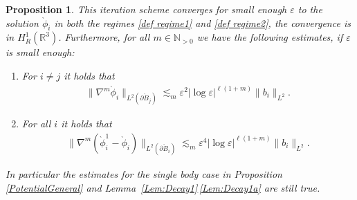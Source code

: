 \documentclass[10pt]{amsart}
\let\epsilon\varepsilon
\newtheorem{proposition}[theorem]{Proposition}
\theoremstyle{definition}
\newcommand\R{\mathbb{R}}
\newcommand\N{\mathbb{N}}
\newcommand\anorm[1]{\lVert #1\rVert}
\newcommand\bnorm[1]{\bigl\lVert #1\bigr\rVert}
\let\de\partial
\let\eps\epsilon
\begin{document}
\begin{proposition}\label{MultiplePotentials}
This iteration scheme converges for small enough $\eps$ to the solution $\grave{\phi}_i$ in both the regimes \eqref{def regime1} and \eqref{def regime2}, the convergence is in $H_R^1(\R^3)$. Furthermore, for all $m\in \N_{>0}$ we have the following estimates, if $\eps$ is small enough:
\begin{enumerate}
\item\label{MultiplePotentialsa}
For $i\neq j$ it holds that
\begin{align*}
\bnorm{\nabla^m\grave{\phi}_i}_{L^2(\de \grave{B}_j)}\lesssim_m \eps^{2}|{\log\eps}|^{\ell(1+m)}\anorm{b_i}_{L^2}.
\end{align*}

\item\label{MultiplePotentialsb}
For all $i$ it holds that
\begin{align*}
\bnorm{\nabla^m(\grave{\phi}_i^1-\grave{\phi}_i)}_{L^2(\de \grave{B}_i)}\lesssim_m\eps^{4}|{\log\eps}|^{\ell(1+m)} \anorm{b_i}_{L^2}.
\end{align*}
\end{enumerate}
In particular the estimates for the single body case in Proposition \ref{PotentialGeneral} and Lem\-ma~\ref{Lem:Decay1}\,\eqref{Lem:Decay1a} are still true.
\end{proposition}
\end{document}
